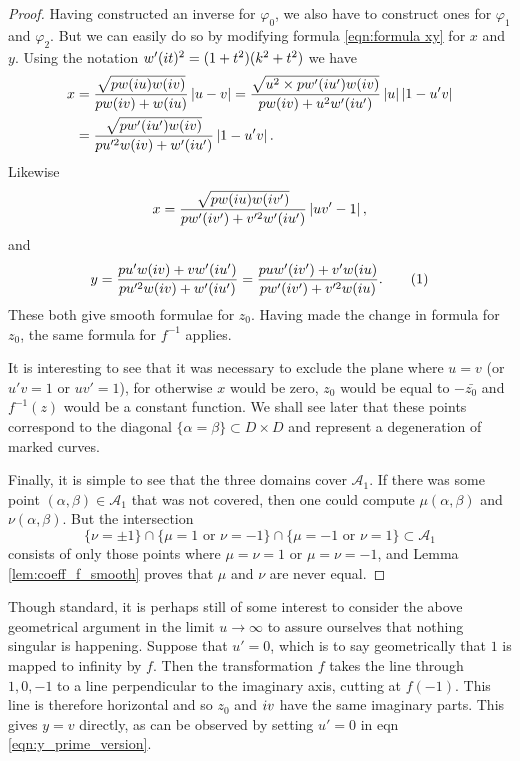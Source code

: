 \begin{lem}
\begin{proof}
Having constructed an inverse for $φ_0$, we also have to construct ones for $φ_1$ and $φ_2$. But we can easily do so by modifying formula \eqref{eqn:formula xy} for $x$ and $y$. Using the notation $w'(i t)^2 = (1+t^2)(k^2 + t^2)$ we have
\begin{align*}
x
&= \frac{\sqrt{pw(i u)w(i v)}}{pw(i v) + w(i u)} \left|u-v\right|
= \frac{\sqrt{u^2 \times pw'(i u')w(i v)}}{pw(i v) + u^2 w'(i u')} \left|u\right|\left|1-u'v\right| \\
&= \frac{\sqrt{pw'(i u')w(i v)}}{pu'^2w(i v) + w'(i u')} \left|1-u'v\right|.
\end{align*}
Likewise
\[
x
= \frac{\sqrt{pw(i u)w(i v')}}{pw'(i v') + v'^2w'(i u')} \left|uv'-1\right|,
\]
and
\[
y
= \frac{pu'w(\iu v) + vw'(\iu u')}{pu'^2w(\iu v) + w'(\iu u')}
= \frac{puw'(\iu v') + v'w(\iu u)}{pw'(\iu v') + v'^2w(\iu u)}. \labelthis{eqn:y_prime_version}
\]
These both give smooth formulae for $z_0$. Having made the change in formula for $z_0$, the same formula for $f^{-1}$ applies.

It is interesting to see that it was necessary to exclude the plane where $u=v$ (or $u'v=1$ or $uv'=1$), for otherwise $x$ would be zero, $z_0$ would be equal to $-\bar{z_0}$ and $f^{-1}(z)$ would be a constant function. We shall see later that these points correspond to the diagonal $\{α=β\} \subset D\times D$ and represent a degeneration of marked curves.

Finally, it is simple to see that the three domains cover $\mathcal{A}_1$. If there was some point $(α,β) \in \mathcal{A}_1$ that was not covered, then one could compute $μ(α,β)$ and $ν(α,β)$. But the intersection
\[
\{ν = \pm 1\}
\cap \{μ = 1 \text{ or } ν = -1 \}
\cap \{μ = -1 \text{ or } ν = 1 \} \subset \mathcal{A}_1
\]
consists of only those points where $μ=ν=1$ or $μ=ν=-1$, and Lemma \ref{lem:coeff_f_smooth} proves that $μ$ and $ν$ are never equal.
\end{proof}
\end{lem}

Though standard, it is perhaps still of some interest to consider the above geometrical argument in the limit $u\to\infty$ to assure ourselves that nothing singular is happening. Suppose that $u' = 0$, which is to say geometrically that $1$ is mapped to infinity by $f$. Then the transformation $f$ takes the line through $1,0,-1$ to a line perpendicular to the imaginary axis, cutting at $f(-1)$. This line is therefore horizontal and so $z_0$ and $i v$ have the same imaginary parts. This gives $y=v$ directly, as can be observed by setting $u'=0$ in eqn \eqref{eqn:y_prime_version}.

